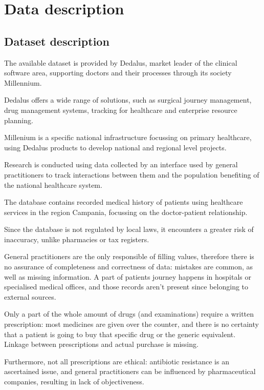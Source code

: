 \chapter{Data description}

\section{Dataset description}
The available dataset is provided by Dedalus, market leader of the clinical software area, supporting doctors and their processes through its society Millennium. 

Dedalus offers a wide range of solutions, such as surgical journey management, drug management systems, tracking for healthcare and enterprise resource planning\cite{dedalus}.

Millenium is a specific national infrastructure focussing on primary healthcare, using Dedalus products to develop national and regional level projects. 

Research is conducted using data collected by an interface used by general practitioners to track interactions between them and the population benefiting of the national healthcare system.

The database contains recorded medical history of patients using healthcare services in the region Campania, focussing on the doctor-patient relationship.

Since the database is not regulated by local laws, it encounters a greater risk of inaccuracy, unlike pharmacies or tax registers. 

General practitioners are the only responsible of filling values, therefore there is no assurance of completeness and correctness of data: mistakes are common, as well as missing information. A part of patients journey happens in hospitals or specialised medical offices, and those records aren't present since belonging to external sources.

Only a part of the whole amount of drugs (and examinations) require a written prescription: most medicines are given over the counter, and there is no certainty that a patient is going to buy that specific drug or the generic equivalent. Linkage between prescriptions and actual purchase is missing.

Furthermore, not all prescriptions are ethical: antibiotic resistance is an ascertained issue, and general practitioners can be influenced by pharmaceutical companies, resulting in lack of objectiveness.

